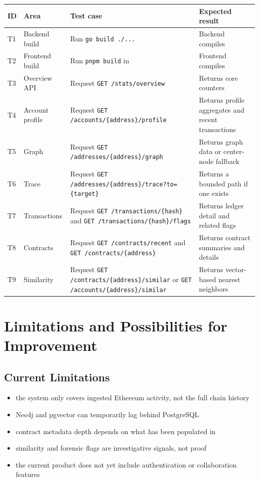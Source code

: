 \documentclass[11pt,a4paper]{article}
\begin{document}
\begin{tabularx}{\textwidth}{@{}p{}p{}p{}Y@{}}
\toprule
\textbf{ID} & \textbf{Area} & \textbf{Test case} & \textbf{Expected result} \\
\midrule
T1 & Backend build & Run \texttt{go build ./...} & Backend compiles \\
T2 & Frontend build & Run \texttt{pnpm build} in  & Frontend compiles \\
T3 & Overview API & Request \texttt{GET /stats/overview} & Returns core counters \\
T4 & Account profile & Request \texttt{GET /accounts/\{address\}/profile} & Returns profile aggregates and recent transactions \\
T5 & Graph & Request \texttt{GET /addresses/\{address\}/graph} & Returns graph data or center-node fallback \\
T6 & Trace & Request \texttt{GET /addresses/\{address\}/trace?to=\{target\}} & Returns a bounded path if one exists \\
T7 & Transactions & Request \texttt{GET /transactions/\{hash\}} and \texttt{GET /transactions/\{hash\}/flags} & Returns ledger detail and related flags \\
T8 & Contracts & Request \texttt{GET /contracts/recent} and \texttt{GET /contracts/\{address\}} & Returns contract summaries and details \\
T9 & Similarity & Request \texttt{GET /contracts/\{address\}/similar} or \texttt{GET /accounts/\{address\}/similar} & Returns vector-based nearest neighbors \\
\bottomrule
\end{tabularx}

\section{Limitations and Possibilities for Improvement}

\subsection{Current Limitations}

\begin{itemize}
\item the system only covers ingested Ethereum activity, not the full chain history
\item Neo4j and pgvector can temporarily lag behind PostgreSQL
\item contract metadata depth depends on what has been populated in 
\item similarity and forensic flags are investigative signals, not proof
\item the current product does not yet include authentication or collaboration features
\end{itemize}
\end{document}
